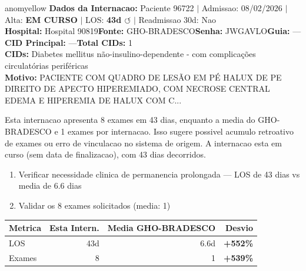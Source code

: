 \documentclass[a4paper,10pt]{article}
\begin{document}
\begin{anomalycard}[Internacao 116428 | GHO-BRADESCO | MODERADO (z=2.20)]{anomyellow}
\textbf{Dados da Internacao:} Paciente 96722 $\mid$ Admissao: 08/02/2026 $\mid$ Alta: \textcolor{anomorange}{\textbf{EM CURSO}} $\mid$ LOS: \textbf{43d \textcolor{anomorange}{$\circlearrowleft$}} $\mid$ Readmissao 30d: Nao\\
\textbf{Hospital:} Hospital 90819\quad\textbf{Fonte:} GHO-BRADESCO\quad\textbf{Senha:} JWGAVLO\quad\textbf{Guia:} ---\\
\textbf{CID Principal:} {\small ---}\quad\textbf{Total CIDs:} 1\\

\textbf{CIDs:} {\scriptsize Diabetes mellitus não-insulino-dependente - com complicações circulatórias periféricas}\\

\textbf{Motivo:} {\scriptsize PACIENTE COM QUADRO DE LESÃO EM PÉ HALUX DE PE DIREITO DE APECTO HIPEREMIADO, COM NECROSE CENTRAL EDEMA E HIPEREMIA DE HALUX COM C...}\\

\vspace{2pt}\begin{tcolorbox}[colback=severityred!20,colframe=anomyellow,title={\textbf{Interpretacao de Negocio}},fonttitle=\bfseries\small,left=4pt,right=4pt,top=3pt,bottom=3pt]
{\small Esta internacao apresenta 8 exames em 43 dias, enquanto a media do GHO-BRADESCO e 1 exames por internacao. Isso sugere possivel acumulo retroativo de exames ou erro de vinculacao no sistema de origem. A internacao esta em curso (sem data de finalizacao), com 43 dias decorridos.}
\end{tcolorbox}
\begin{tcolorbox}[colback=severityyellow!30,colframe=anomorange,title={\textbf{Recomendacoes Especificas}},fonttitle=\bfseries\small,left=4pt,right=4pt,top=3pt,bottom=3pt]
\begin{enumerate}[nosep,leftmargin=16pt]
\item {\small Verificar necessidade clinica de permanencia prolongada --- LOS de 43 dias vs media de 6.6 dias}
\item {\small Validar os 8 exames solicitados (media: 1)}
\end{enumerate}
\end{tcolorbox}
\begin{center}\begin{tabular}{l r r r}\toprule\textbf{Metrica} & \textbf{Esta Intern.} & \textbf{Media GHO-BRADESCO} & \textbf{Desvio} \\\midrule
LOS & 43d & 6.6d & \textcolor{anomred}{\textbf{+552\%}} \\
Exames & 8 & 1 & \textcolor{anomred}{\textbf{+539\%}} \\
\bottomrule\end{tabular}\end{center}


\end{anomalycard}
\end{document}
